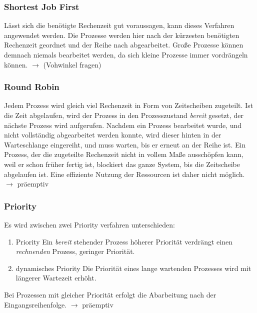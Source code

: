 \documentclass[12pt,a4paper]{article}
\begin{document}
\subsubsection{Shortest Job First}
Lässt sich die benötigte Rechenzeit gut voraussagen, kann dieses Verfahren angewendet werden. Die Prozesse werden hier nach der kürzesten benötigten Rechenzeit geordnet und der Reihe nach abgearbeitet. Große Prozesse können demnach niemals bearbeitet werden, da sich kleine Prozesse immer vordrängeln können.\newline\newline
$\longrightarrow$ (Vohwinkel fragen)

\subsubsection{Round Robin}
Jedem Prozess wird gleich viel Rechenzeit in Form von Zeitscheiben zugeteilt. Ist die Zeit abgelaufen, wird der Prozess in den Prozesszustand \textit{bereit} gesetzt, der nächste Prozess wird aufgerufen. Nachdem ein Prozess bearbeitet wurde, und nicht vollständig abgearbeitet werden konnte, wird dieser hinten in der Warteschlange eingereiht, und muss warten, bis er erneut an der Reihe ist. Ein Prozess, der die zugeteilte Rechenzeit nicht in vollem Maße ausschöpfen kann, weil er schon früher fertig ist, blockiert das ganze System, bis die Zeitscheibe abgelaufen ist. Eine effiziente Nutzung der Ressourcen ist daher nicht möglich.\newline\newline
$\longrightarrow$ präemptiv

\subsubsection{Priority}
Es wird zwischen zwei Priority verfahren unterschieden:
\begin{enumerate}
	\item Priority\newline
			Ein \textit{bereit} stehender Prozess höherer Priorität verdrängt einen \textit{rechnenden} Prozess, geringer Priorität.
	\item dynamisches Priority
			Die Priorität eines lange wartenden Prozesses wird mit längerer Wartezeit erhöht.
\end{enumerate}
Bei Prozessen mit gleicher Priorität erfolgt die Abarbeitung nach der Eingangsreihenfolge.\newline\newline
$\longrightarrow$ präemptiv
\end{document}
